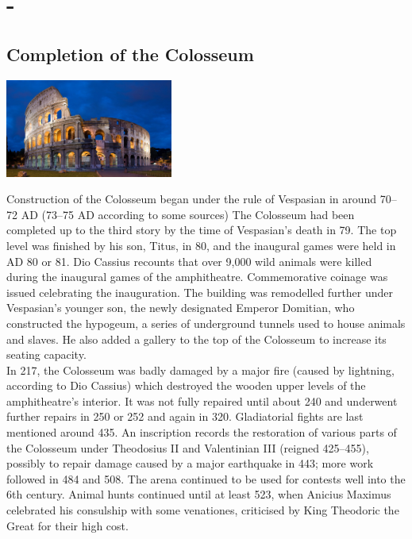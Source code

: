 \documentclass[11pt]{report}
\begin{document}
\section{-}
\subsection{Completion of the Colosseum}
\vspace{2mm}\begin{center}\includegraphics[width=5.5cm]{./img/coliseum.jpg}\end{center}
Construction of the Colosseum began under the rule of Vespasian in around 70–72 AD (73–75 AD according to some sources) The Colosseum had been completed up to the third story by the time of Vespasian's death in 79. The top level was finished by his son, Titus, in 80, and the inaugural games were held in AD 80 or 81. Dio Cassius recounts that over 9,000 wild animals were killed during the inaugural games of the amphitheatre. Commemorative coinage was issued celebrating the inauguration. The building was remodelled further under Vespasian's younger son, the newly designated Emperor Domitian, who constructed the hypogeum, a series of underground tunnels used to house animals and slaves. He also added a gallery to the top of the Colosseum to increase its seating capacity.\\
\indent In 217, the Colosseum was badly damaged by a major fire (caused by lightning, according to Dio Cassius) which destroyed the wooden upper levels of the amphitheatre's interior. It was not fully repaired until about 240 and underwent further repairs in 250 or 252 and again in 320. Gladiatorial fights are last mentioned around 435. An inscription records the restoration of various parts of the Colosseum under Theodosius II and Valentinian III (reigned 425–455), possibly to repair damage caused by a major earthquake in 443; more work followed in 484 and 508. The arena continued to be used for contests well into the 6th century. Animal hunts continued until at least 523, when Anicius Maximus celebrated his consulship with some venationes, criticised by King Theodoric the Great for their high cost.
\end{document}

